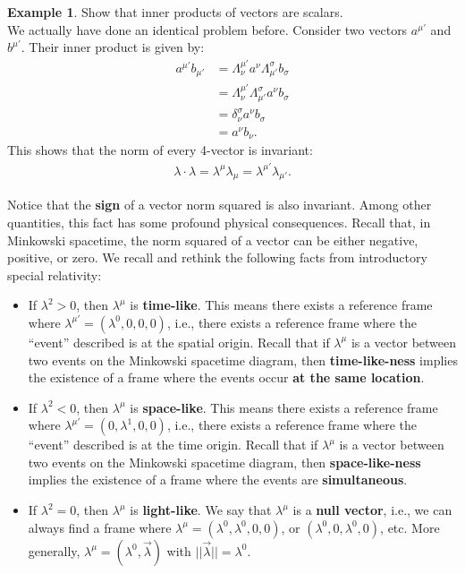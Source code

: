 \documentclass{book}
\theoremstyle{definition}
\newtheorem{exmp}{Example}[section]
\begin{document}
\begin{exmp}
	Show that inner products of vectors are scalars.\\
	
	We actually have done an identical problem before. Consider two vectors $a^{\mu'}$ and $b^{\mu'}$. Their inner product is given by:
	\begin{align*}
	a^{\mu'}b_{\mu'} &= \Lambda^{\mu'}_{\nu}a^{\nu}\Lambda^{\sigma}_{\mu'}b_\sigma\\
	&= \Lambda^{\mu'}_{\nu}\Lambda^{\sigma}_{\mu'}a^{\nu}b_\sigma\\
	&= \delta^\sigma_\nu a^\nu b_\sigma\\
	&= a^\nu b_\nu.
	\end{align*}
	This shows that the norm of every 4-vector is invariant:
	\begin{align*}
	\lambda\cdot\lambda = \lambda^\mu \lambda_\mu = \lambda^{\mu'}\lambda_{\mu'}.
	\end{align*}
\end{exmp}

Notice that the \textbf{sign} of a vector norm squared is also invariant. Among other quantities, this fact has some profound physical consequences. Recall that, in Minkowski spacetime, the norm squared of a vector can be either negative, positive, or zero. We recall and rethink the following facts from introductory special relativity:
\begin{itemize}
	\item If $\lambda^2 > 0$, then $\lambda^\mu$ is \textbf{time-like}. This means there exists a reference frame where $\lambda^{\mu'} = (\lambda^0,0,0,0)$, i.e., there exists a reference frame where the ``event'' described is at the spatial origin. Recall that if $\lambda^\mu$ is a vector between two events on the Minkowski spacetime diagram, then \textbf{time-like-ness} implies the existence of a frame where the events occur \textbf{at the same location}.
	\item If $\lambda^2 < 0$, then $\lambda^\mu$ is \textbf{space-like}. This means there exists a reference frame where $\lambda^{\mu'} = (0, \lambda^1,0,0)$, i.e., there exists a reference frame where the ``event'' described is at the time origin. Recall that if $\lambda^\mu$ is a vector between two events on the Minkowski spacetime diagram, then \textbf{space-like-ness} implies the existence of a frame where the events are \textbf{simultaneous}.
	\item If $\lambda^2 = 0$, then $\lambda^\mu$ is \textbf{light-like}. We say that $\lambda^\mu$ is a \textbf{null vector}, i.e., we can always find a frame where $\lambda^\mu = (\lambda^0, \lambda^0,0,0)$, or $(\lambda^0, 0, \lambda^0, 0)$, etc. More generally, $\lambda^\mu = (\lambda^0, \vec{\lambda})$ with $\vert\vert\vec{\lambda}\vert\vert = \lambda^0$.\\
\end{itemize}
\end{document}
